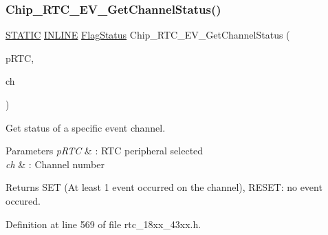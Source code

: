 \subsubsection{\texorpdfstring{Chip\+\_\+\+R\+T\+C\+\_\+\+E\+V\+\_\+\+Get\+Channel\+Status()}{Chip\_RTC\_EV\_GetChannelStatus()}}
{\footnotesize\ttfamily \hyperlink{group___l_p_c___types___public___macros_ga10b2d890d871e1489bb02b7e70d9bdfb}{S\+T\+A\+T\+IC} \hyperlink{spifi__18xx__43xx_8h_a2eb6f9e0395b47b8d5e3eeae4fe0c116}{I\+N\+L\+I\+NE} \hyperlink{group___l_p_c___types___public___types_ga89136caac2e14c55151f527ac02daaff}{Flag\+Status} Chip\+\_\+\+R\+T\+C\+\_\+\+E\+V\+\_\+\+Get\+Channel\+Status (\begin{DoxyParamCaption}\item[{\hyperlink{struct_l_p_c___r_t_c___t}{L\+P\+C\+\_\+\+R\+T\+C\+\_\+T} $\ast$}]{p\+R\+TC,  }\item[{\hyperlink{group___r_t_c__18_x_x__43_x_x_gaac7e8d7c66860037449fdde1bdfb657b}{R\+T\+C\+\_\+\+E\+V\+\_\+\+C\+H\+A\+N\+N\+E\+L\+\_\+T}}]{ch }\end{DoxyParamCaption})}



Get status of a specific event channel. 


\begin{DoxyParams}{Parameters}
{\em p\+R\+TC} & \+: R\+TC peripheral selected \\
\hline
{\em ch} & \+: Channel number \\
\hline
\end{DoxyParams}
\begin{DoxyReturn}{Returns}
S\+ET (At least 1 event occurred on the channel), R\+E\+S\+ET\+: no event occured. 
\end{DoxyReturn}


Definition at line 569 of file rtc\+\_\+18xx\+\_\+43xx.\+h.

\mbox{\label{group___r_t_c__18_x_x__43_x_x_ga5e03e0be6371bbd1e778f7e10653f045}} 
